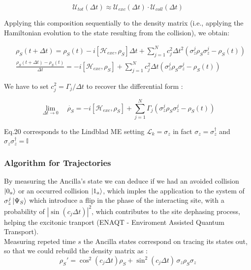 \documentclass[a4paper,12pt]{article}
\begin{document}
	\begin{equation}
		\mathcal{U}_{tot}(\Delta t) \approx \mathcal{U}_{exc}(\Delta t) \cdot \mathcal{U}_{coll}(\Delta t)
	\end{equation}
	
	Applying this composition sequentially to the density matrix (i.e., applying the Hamiltonian evolution to the state resulting from the collision), we obtain:
	
	\begin{align}
		&\rho_S \left(t + \Delta t\right) = \rho_S (t) - i \left[\mathcal{H}_{exc}, \rho_S \right]\Delta t + \sum_{j=1}^{N}{c_{j}^{2} \Delta t ^{2} \left( \sigma_{z}^{j} \rho_S \sigma_{z}^{j} - \rho_S (t) \right)} \\
		&\frac{\rho_S \left(t + \Delta t\right) - \rho_S (t)}{\Delta t} = - i \left[\mathcal{H}_{exc}, \rho_S \right] + \sum_{j=1}^{N}{c_{j}^{2} \Delta t \left( \sigma_{z}^{j} \rho_S \sigma_{z}^{j} - \rho_S (t) \right)} 
	\end{align}
	
	We have to set $ c_{j}^{2} = \Gamma_j / \Delta t  $ to recover the differential form : 
	
	\begin{equation}
		\lim\limits_{\Delta t \rightarrow 0} \quad \dot{\rho_S} = - i \left[\mathcal{H}_{exc}, \rho_S \right] + \sum_{j=1}^{N}{\Gamma_{j} \left( \sigma_{z}^{j} \rho_S \sigma_{z}^{j} - \rho_S (t) \right)}
	\end{equation}
	
	Eq.20 corresponds to the Lindblad ME setting $ \mathcal{L}_k = \sigma_{z} $ in fact $ \sigma_{z} = \sigma_{z}^{\dagger} $ and $ \sigma_{z} \sigma_{z}^{\dagger} = \mathbb{I} $	
	
	\subsubsection{Algorithm for Trajectories}
	
	By measuring the Ancilla's state we can deduce if we had an avoided collision $ \ket{0_a} $ or an occurred collision $ \ket{1_a} $, which imples the application to the system of $ \sigma_{z}^{j} \ket{\Psi_S} $ which introduce a flip in the phase of the interacting site, with a probability of $ \left| {\sin \left(c_j \Delta t \right)} \right|^2  $, which contributes to the site dephasing process, helping the excitonic tranport (ENAQT - Enviroment Assisted Quantum Transport). \\
	Measuring repeted time $ s $ the Ancilla states correspond on tracing its states out, so that we could rebuild the density matrix as :
	\begin{equation}
		\rho_S' = \cos^{2}{\left(c_{j} \Delta t\right)} \rho_S + \sin^{2}{\left(c_{j} \Delta t\right)} \, \sigma_{z} \rho_S \sigma_{z} 
	\end{equation}
\end{document}
